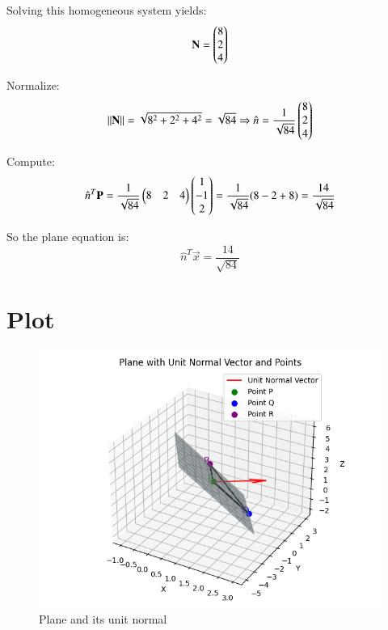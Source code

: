\documentclass[journal]{IEEEtran}
\begin{document}
Solving this homogeneous system yields:
\[
\mathbf{N} = \begin{pmatrix}8 \\ 2 \\ 4\end{pmatrix}
\]

Normalize:
\[
\|\mathbf{N}\| = \sqrt{8^2 + 2^2 + 4^2} = \sqrt{84}
\Rightarrow
\hat{n} = \frac{1}{\sqrt{84}} \begin{pmatrix}8 \\ 2 \\ 4\end{pmatrix}
\]

Compute:
\[
\hat{n}^T \mathbf{P} = \frac{1}{\sqrt{84}} \begin{pmatrix}8 & 2 & 4\end{pmatrix} \begin{pmatrix}1 \\ -1 \\ 2\end{pmatrix}
= \frac{1}{\sqrt{84}} (8 - 2 + 8) = \frac{14}{\sqrt{84}}
\]

So the plane equation is:
\[
\hat{n}^T \vec{x} = \frac{14}{\sqrt{84}}
\]



















\section*{\large\textbf{Plot}}
\begin{figure}[H]
\centering
\includegraphics[width=0.8\linewidth]{Figs/fig1.png} \caption{Plane and its unit normal}
\end{figure}
\end{document}
